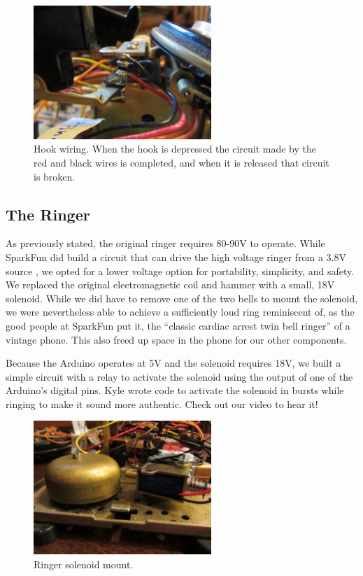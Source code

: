 \documentclass{es50report}
\begin{document}
    \begin{figure}
        \centering
        \includegraphics[width=0.6\textwidth, clip=true, trim=200 50 200 70]{images/hookWiring}
        \caption{Hook wiring. When the hook is depressed the circuit made by the red and black wires is completed, and when it is released that circuit is broken.}\label{fig:hookWiring}
    \end{figure}

    \subsection{The Ringer}
    As previously stated, the original ringer requires 80-90V to operate. While SparkFun did build a circuit that can drive the high voltage ringer from a 3.8V source \cite{pete05}, we opted for a lower voltage option for portability, simplicity, and safety. We replaced the original electromagnetic coil and hammer with a small, 18V solenoid. While we did have to remove one of the two bells to mount the solenoid, we were nevertheless able to achieve a sufficiently loud ring reminiscent of, as the good people at SparkFun put it, the  ``classic cardiac arrest twin bell ringer'' of a vintage phone. This also freed up space in the phone for our other components.

    Because the Arduino operates at 5V and the solenoid requires 18V, we built a simple circuit with a relay to activate the solenoid using the output of one of the Arduino's digital pins. Kyle wrote code to activate the solenoid in bursts while ringing to make it sound more authentic. Check out our video to hear it!

    \begin{figure}
        \centering
        \includegraphics[width=0.6\textwidth, clip=true, trim=0 450 0 0]{images/solenoidMount}
        \caption{Ringer solenoid mount.}\label{fig:solenoidMount}
    \end{figure}
\end{document}
